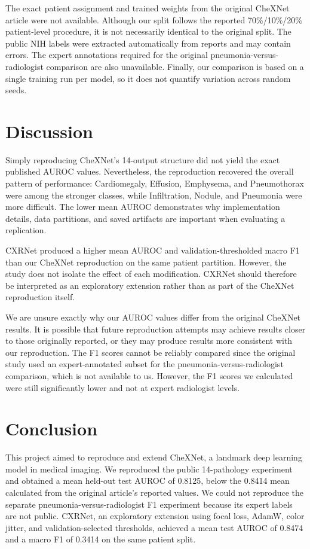 The exact patient assignment and trained weights from the original CheXNet
article were not available. Although our split follows the reported
70\%/10\%/20\% patient-level procedure, it is not necessarily identical to the
original split. The public NIH labels were extracted automatically from reports
and may contain errors. The expert annotations required for the original
pneumonia-versus-radiologist comparison are also unavailable. Finally, our
comparison is based on a single training run per model, so it does not quantify
variation across random seeds.


\section{Discussion}

Simply reproducing CheXNet's 14-output structure did not yield the exact
published AUROC values. Nevertheless, the reproduction recovered the overall
pattern of performance: Cardiomegaly, Effusion, Emphysema, and Pneumothorax
were among the stronger classes, while Infiltration, Nodule, and Pneumonia were
more difficult. The lower mean AUROC demonstrates why implementation details,
data partitions, and saved artifacts are important when evaluating a
replication.

CXRNet produced a higher mean AUROC and validation-thresholded macro F1 than
our CheXNet reproduction on the same patient partition. However, the study does
not isolate the effect of each modification. CXRNet should therefore be
interpreted as an exploratory extension rather than as part of the CheXNet
reproduction itself.

We are unsure exactly why our AUROC values differ from the original CheXNet results.
It is possible that future reproduction attempts may achieve results closer
to those originally reported, or they may produce results more consistent
with our reproduction. The F1 scores cannot be reliably compared since
the original study used an expert-annotated subset for the pneumonia-versus-radiologist comparison, 
which is not available to us. However, the F1 scores we calculated were still significantly lower
and not at expert radiologist levels.

\section{Conclusion}

This project aimed to reproduce and extend CheXNet, a landmark deep learning
model in medical imaging. We reproduced the public 14-pathology experiment and
obtained a mean held-out test AUROC of 0.8125, below the 0.8414 mean calculated
from the original article's reported values. We could not reproduce the
separate pneumonia-versus-radiologist F1 experiment because its expert labels
are not public. CXRNet, an exploratory extension using focal loss, AdamW,
color jitter, and validation-selected thresholds, achieved a mean test AUROC
of 0.8474 and a macro F1 of 0.3414 on the same patient split.

